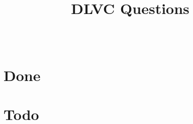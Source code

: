 \documentclass[11pt,a4paper]{article}
\title{DLVC Questions}
\author{ \authorname{Abraham Hinteregger} \\
}
\begin{document}
\maketitle
\listoftodos
\clearpage\part{Done}
\clearpage\part{Todo}
\end{document}
